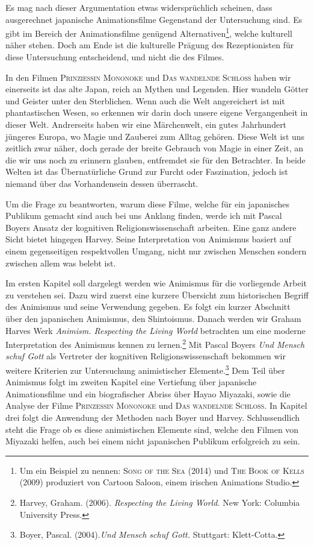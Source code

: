 Es mag nach dieser Argumentation etwas widersprüchlich scheinen, dass ausgerechnet japanische Animationsfilme Gegenstand der Untersuchung sind. Es gibt im Bereich der Animationsfilme genügend Alternativen\footnote{Um ein Beispiel zu nennen: \textsc{Song of the Sea} (2014) und \textsc{The Book of Kells} (2009) produziert von Cartoon Saloon, einem irischen Animations Studio.}, welche kulturell näher stehen. Doch am Ende ist die kulturelle Prägung des Rezeptionisten für diese Untersuchung entscheidend, und nicht die des Filmes. 

In den Filmen \textsc{Prinziessin Mononoke} und \textsc{Das wandelnde Schloss} haben wir einerseits ist das alte Japan, reich an Mythen und Legenden. Hier wandeln Götter und Geister unter den Sterblichen. Wenn auch die Welt angereichert ist mit phantastischen Wesen, so erkennen wir darin doch unsere eigene Vergangenheit in dieser Welt. Andrerseits haben wir eine Märchenwelt, ein gutes Jahrhundert jüngeres Europa, wo Magie und Zauberei zum Alltag gehören. Diese Welt ist uns zeitlich zwar näher, doch gerade der breite Gebrauch von Magie in einer Zeit, an die wir uns noch zu erinnern glauben, entfremdet sie für den Betrachter. In beide Welten ist das Übernatürliche Grund zur Furcht oder Faszination, jedoch ist niemand über das Vorhandensein dessen überrascht.

Um die Frage zu beantworten, warum diese Filme, welche für ein japanisches Publikum gemacht sind auch bei uns Anklang finden, werde ich mit Pascal Boyers Ansatz der kognitiven Religionswissenschaft arbeiten. Eine ganz andere Sicht bietet hingegen Harvey. Seine Interpretation von Animismus basiert auf einem gegenseitigen respektvollen Umgang, nicht nur zwischen Menschen sondern zwischen allem was belebt ist.

\medskip

Im ersten Kapitel soll dargelegt werden wie Animismus für die vorliegende Arbeit zu verstehen sei. Dazu wird zuerst eine kurzere Übersicht zum historischen Begriff des Animismus und seine Verwendung gegeben. Es folgt ein kurzer Abschnitt über den japanischen Animismus, den Shintoismus. Danach werden wir Graham Harves Werk \emph{Animism. Respecting the Living World} betrachten um eine moderne Interpretation des Animismus kennen zu lernen.\footnote{Harvey, Graham. (2006). \emph{Respecting the Living World.} New York: Columbia University Press.} Mit Pascal Boyers \emph{Und Mensch schuf Gott} als Vertreter der kognitiven Religionswissenschaft bekommen wir weitere Kriterien zur Untersuchung animistischer Elemente.\footnote{Boyer, Pascal. (2004).\emph{Und Mensch schuf Gott.} Stuttgart: Klett-Cotta.} Dem Teil über Animismus folgt im zweiten Kapitel eine Vertiefung über japanische Animationsfilme und ein biografischer Abriss über Hayao Miyazaki, sowie die Analyse der Filme \textsc{Prinzessin Mononoke} und \textsc{Das wandelnde Schloss}. In Kapitel drei folgt die Anwendung der Methoden nach Boyer und Harvey. Schlussendlich steht die Frage ob es diese animistischen Elemente sind, welche den Filmen von Miyazaki helfen, auch bei einem nicht japanischen Publikum erfolgreich zu sein.